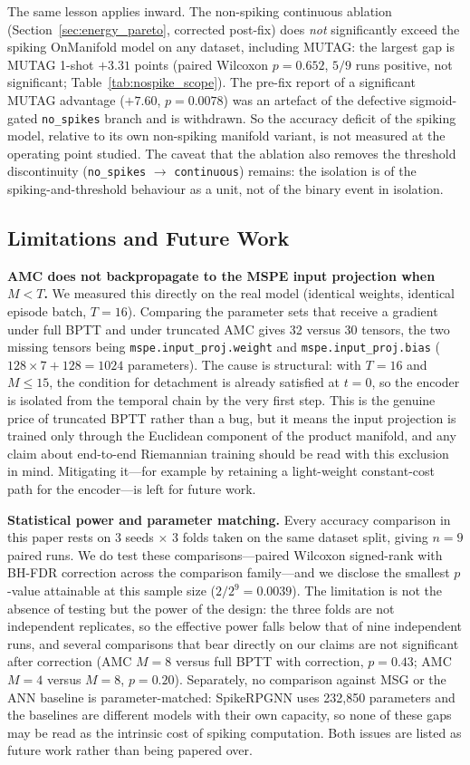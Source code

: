 \documentclass[a4paper,fleqn]{cas-dc}
\begin{document}
The same lesson applies inward. The non-spiking continuous ablation (Section~\ref{sec:energy_pareto}, corrected post-fix) does \emph{not} significantly exceed the spiking OnManifold model on any dataset, including MUTAG: the largest gap is MUTAG 1-shot $+3.31$ points (paired Wilcoxon $p{=}0.652$, $5/9$ runs positive, not significant; Table~\ref{tab:nospike_scope}). The pre-fix report of a significant MUTAG advantage ($+7.60$, $p{=}0.0078$) was an artefact of the defective sigmoid-gated \texttt{no\_spikes} branch and is withdrawn. So the accuracy deficit of the spiking model, relative to its own non-spiking manifold variant, is not measured at the operating point studied. The caveat that the ablation also removes the threshold discontinuity (\texttt{no\_spikes} $\to$ \texttt{continuous}) remains: the isolation is of the spiking-and-threshold behaviour as a unit, not of the binary event in isolation.

\subsection{Limitations and Future Work}

\textbf{AMC does not backpropagate to the MSPE input projection when $M<T$.} We measured this directly on the real model (identical weights, identical episode batch, $T{=}16$). Comparing the parameter sets that receive a gradient under full BPTT and under truncated AMC gives 32 versus 30 tensors, the two missing tensors being \texttt{mspe.input\_proj.weight} and \texttt{mspe.input\_proj.bias} ($128\times7+128=1024$ parameters). The cause is structural: with $T{=}16$ and $M\le 15$, the condition for detachment is already satisfied at $t{=}0$, so the encoder is isolated from the temporal chain by the very first step. This is the genuine price of truncated BPTT rather than a bug, but it means the input projection is trained only through the Euclidean component of the product manifold, and any claim about end-to-end Riemannian training should be read with this exclusion in mind. Mitigating it---for example by retaining a light-weight constant-cost path for the encoder---is left for future work.

\textbf{Statistical power and parameter matching.} Every accuracy comparison in this paper rests on 3 seeds $\times$ 3 folds taken on the same dataset split, giving $n{=}9$ paired runs. We do test these comparisons---paired Wilcoxon signed-rank with BH-FDR correction across the comparison family---and we disclose the smallest $p$-value attainable at this sample size ($2/2^{9}{=}0.0039$). The limitation is not the absence of testing but the power of the design: the three folds are not independent replicates, so the effective power falls below that of nine independent runs, and several comparisons that bear directly on our claims are not significant after correction (AMC $M{=}8$ versus full BPTT with correction, $p{=}0.43$; AMC $M{=}4$ versus $M{=}8$, $p{=}0.20$). Separately, no comparison against MSG or the ANN baseline is parameter-matched: SpikeRPGNN uses 232,850 parameters and the baselines are different models with their own capacity, so none of these gaps may be read as the intrinsic cost of spiking computation. Both issues are listed as future work rather than being papered over.
\end{document}
